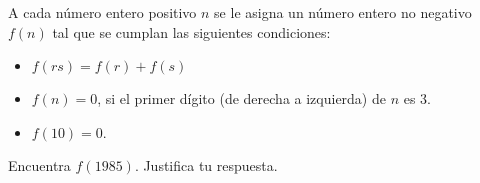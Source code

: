 A cada número entero positivo $n$ se le asigna un número entero no negativo $f(n)$ tal que se cumplan las siguientes condiciones:
 \begin{itemize} 
 \item  $f(rs) = f(r)+f(s)$
 \item  $f(n) = 0$, si el primer dígito (de derecha a izquierda) de $n$ es 3.
 \item  $f(10) = 0$.
 \end{itemize} 
Encuentra $f(1985)$. Justifica tu respuesta.


